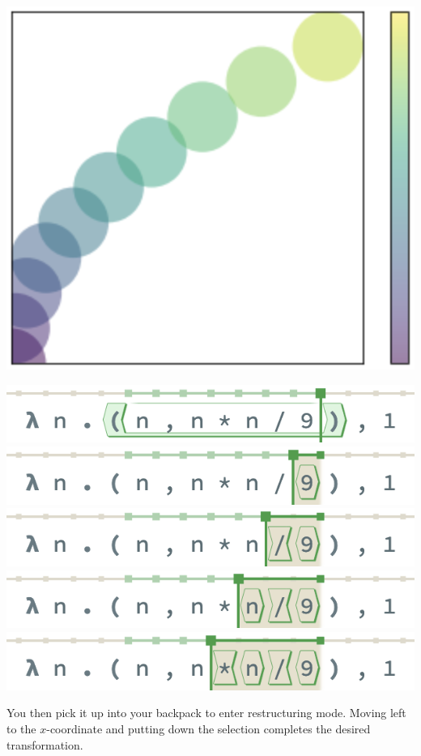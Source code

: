\noindent
\begin{minipage}[t]{0.2\columnwidth}
  \includegraphics[width=\textwidth]{img/circles-parabola-transpose.png}
\end{minipage}
\hfill
\begin{minipage}{0.65\columnwidth}
  \includegraphics[width=\textwidth]{img/selection-whole-0.png}
  \includegraphics[width=\textwidth]{img/selection-whole-1.png}
  \includegraphics[width=\textwidth]{img/selection-whole-2.png}
  \includegraphics[width=\textwidth]{img/selection-whole-3.png}
  \includegraphics[width=\textwidth]{img/selection-whole-4.png}
\end{minipage}
You then pick it up into your backpack to enter
restructuring mode.
Moving left to the $x$-coordinate and putting down
the selection completes the desired transformation.

